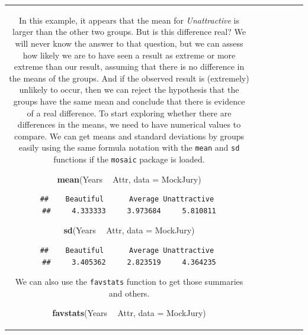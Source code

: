 \documentclass[]{book}
\newenvironment{Shaded}{\begin{snugshade}}{\end{snugshade}}
\newcommand{\KeywordTok}[1]{\textcolor[rgb]{0.13,0.29,0.53}{\textbf{#1}}}
\newcommand{\DataTypeTok}[1]{\textcolor[rgb]{0.13,0.29,0.53}{#1}}
\newcommand{\StringTok}[1]{\textcolor[rgb]{0.31,0.60,0.02}{#1}}
\newcommand{\OperatorTok}[1]{\textcolor[rgb]{0.81,0.36,0.00}{\textbf{#1}}}
\newcommand{\NormalTok}[1]{#1}
\theoremstyle{definition}
\theoremstyle{definition}
\theoremstyle{remark}
\begin{document}
\begin{longtable}[]{@{}ccccccc@{}}
\begin{minipage}[b]{0.10\columnwidth}
In this example, it appears that the mean for \emph{Unattractive} is
larger than the other two groups. But is this difference real? We will
never know the answer to that question, but we can assess how likely we
are to have seen a result as extreme or more extreme than our result,
assuming that there is no difference in the means of the groups. And if
the observed result is (extremely) unlikely to occur, then we can reject
the hypothesis that the groups have the same mean and conclude that
there is evidence of a real difference. To start exploring whether there
are differences in the means, we need to have numerical values to
compare. We can get means and standard deviations by groups easily using
the same formula notation with the \texttt{mean} and \texttt{sd}
functions if the \texttt{mosaic} package is loaded.

\begin{Shaded}
\begin{Highlighting}[]
\KeywordTok{mean}\NormalTok{(Years }\OperatorTok{~}\StringTok{ }\NormalTok{Attr, }\DataTypeTok{data =}\NormalTok{ MockJury)}
\end{Highlighting}
\end{Shaded}

\begin{verbatim}
##    Beautiful      Average Unattractive 
##     4.333333     3.973684     5.810811
\end{verbatim}

\begin{Shaded}
\begin{Highlighting}[]
\KeywordTok{sd}\NormalTok{(Years }\OperatorTok{~}\StringTok{ }\NormalTok{Attr, }\DataTypeTok{data =}\NormalTok{ MockJury)}
\end{Highlighting}
\end{Shaded}

\begin{verbatim}
##    Beautiful      Average Unattractive 
##     3.405362     2.823519     4.364235
\end{verbatim}

We can also use the \texttt{favstats} function to get those summaries
and others.

\begin{Shaded}
\begin{Highlighting}[]
\KeywordTok{favstats}\NormalTok{(Years }\OperatorTok{~}\StringTok{ }\NormalTok{Attr, }\DataTypeTok{data =}\NormalTok{ MockJury)}
\end{Highlighting}
\end{Shaded}


\end{minipage}
\end{longtable}
\end{document}
